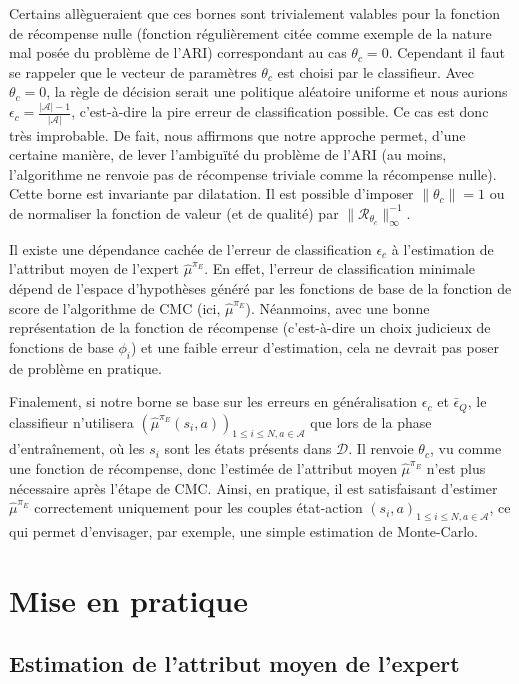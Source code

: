 \documentclass[french,utf8]{./hermes-journal}
\newcommand{\R}{\mathcal{R}}
\newcommand{\A}{\mathcal{A}}
\newcommand{\D}{\mathcal{D}}
\begin{document}
Certains allègueraient que ces bornes sont trivialement valables pour la fonction de récompense nulle (fonction régulièrement citée comme exemple de la nature mal posée du problème de l'ARI) correspondant au cas $\theta_c=0$. Cependant il faut se rappeler que le vecteur de paramètres $\theta_c$ est choisi par le classifieur. Avec 
$\theta_c=0$, la règle de décision serait une politique aléatoire uniforme et nous aurions $\epsilon_c = \frac{|\A|-1}{|\A|}$, c'est-à-dire la pire erreur de classification possible. Ce cas est donc très improbable. De fait, nous affirmons que notre approche permet, d'une certaine manière, de lever l'ambiguïté du problème de l'ARI (au moins, l'algorithme ne renvoie pas de récompense triviale comme la récompense nulle).
%
Cette borne est invariante par dilatation. Il est possible d'imposer 
$\|\theta_c\|=1$ ou de normaliser la fonction de valeur (et de qualité) par 
$\|\R_{\theta_c}\|_\infty^{-1}$.

Il existe une dépendance cachée de l'erreur de classification  $\epsilon_c$ à l'estimation de l'attribut moyen de l'expert  $\hat{\mu}^{\pi_E}$. En effet, l'erreur de classification minimale dépend de l'espace d'hypothèses généré par les fonctions de base de la fonction de score de l'algorithme de CMC (ici, 
$\hat{\mu}^{\pi_E}$). Néanmoins, avec une bonne représentation de la fonction de récompense (c'est-à-dire un choix judicieux de fonctions de base $\phi_i$) et une faible erreur d'estimation, cela ne devrait pas poser de problème en pratique.

Finalement, si notre borne se base sur les erreurs en généralisation 
$\epsilon_c$ et $\bar{\epsilon}_Q$, le classifieur n'utilisera 
$(\hat{\mu}^{\pi_E}(s_i,a))_{1\leq i\leq N,a\in\A}$ que lors de la phase d'entraînement, où les $s_i$ sont les états présents dans $\D$. Il renvoie 
$\theta_c$, vu comme une fonction de récompense, donc l'estimée de l'attribut moyen $\hat{\mu}^{\pi_E}$ n'est plus nécessaire après l'étape de CMC. Ainsi, en pratique, il est satisfaisant d'estimer 
$\hat{\mu}^{\pi_E}$ correctement uniquement pour les couples état-action $(s_i,a)_{1\leq i\leq
N,a\in\A}$, ce qui permet d'envisager, par exemple, une simple estimation de Monte-Carlo.

\section{Mise en pratique}
\label{seracticalApproach}

\subsection{Estimation de l'attribut moyen de l'expert}
\label{subseracticalApproacuE}
\end{document}
